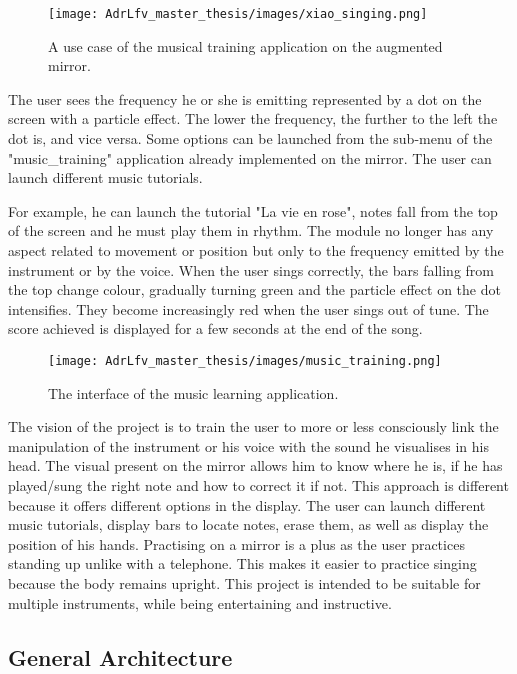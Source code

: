 \begin{figure}[h]
    \centering
    \texttt{[image: AdrLfv\_master\_thesis/images/xiao\_singing.png]}
    \caption{A use case of the musical training application on the augmented mirror.}
    \label{fig:SLR_structure}
\end{figure}

The user sees the frequency he or she is emitting represented by a dot on the screen with a particle effect. The lower the frequency, the further to the left the dot is, and vice versa. Some options can be launched from the sub-menu of the "music\_training" application already
implemented on the mirror. The user can launch different music tutorials.

For example, he can launch the tutorial "La vie en rose", notes fall from the top of the screen and he must play them in rhythm. The module no longer has any aspect related to movement or position but only to the frequency emitted by the instrument or by the voice.
When the user sings correctly, the bars falling from the top change colour, gradually turning green and the particle effect on the dot intensifies. They become increasingly red when the user sings out of tune. The score achieved is displayed for a few seconds at the
end of the song.

\begin{figure}[h]
    \centering
    \texttt{[image: AdrLfv\_master\_thesis/images/music\_training.png]}
    \caption{The interface of the music learning application.}
    \label{fig:SLR_structure}
\end{figure}

The vision of the project is to train the user to more or less consciously link the manipulation of the instrument or his voice with the sound he visualises in his head. The visual present on the mirror allows him to know where he is, if he has played/sung the right note and how to correct it if not.
This approach is different because it offers different options in the display. The user can launch different music tutorials, display bars to locate notes, erase them, as well as display the position of his hands.
Practising on a mirror is a plus as the user practices standing up unlike with a telephone. This makes it easier to practice singing because the body remains upright. This project is intended to be suitable for multiple instruments, while being entertaining and instructive.

\subsection{General Architecture}

